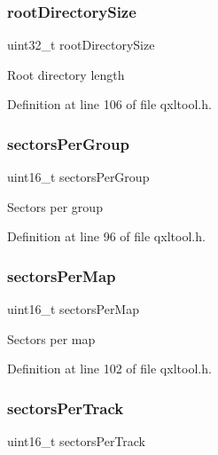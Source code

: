 \subsubsection{\texorpdfstring{root\+Directory\+Size}{rootDirectorySize}}
{\footnotesize\ttfamily uint32\+\_\+t root\+Directory\+Size}

Root directory length 

Definition at line 106 of file qxltool.\+h.

\mbox{\label{struct_h_e_a_d_e_r_aec959e3993607a7c8a039a03639cac44}} 
\subsubsection{\texorpdfstring{sectors\+Per\+Group}{sectorsPerGroup}}
{\footnotesize\ttfamily uint16\+\_\+t sectors\+Per\+Group}

Sectors per group 

Definition at line 96 of file qxltool.\+h.

\mbox{\label{struct_h_e_a_d_e_r_a64a257d7a41c66c743cf02ce75a7ed69}} 
\subsubsection{\texorpdfstring{sectors\+Per\+Map}{sectorsPerMap}}
{\footnotesize\ttfamily uint16\+\_\+t sectors\+Per\+Map}

Sectors per map 

Definition at line 102 of file qxltool.\+h.

\mbox{\label{struct_h_e_a_d_e_r_a42886f9109ee1759d5972e871f0689a8}} 
\subsubsection{\texorpdfstring{sectors\+Per\+Track}{sectorsPerTrack}}
{\footnotesize\ttfamily uint16\+\_\+t sectors\+Per\+Track}

